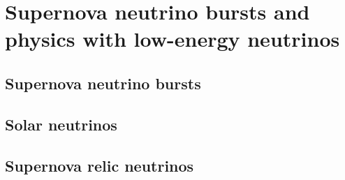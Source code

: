 \chapter{Supernova neutrino bursts and physics with low-energy neutrinos}
\label{ch:snb-lowe}


\section{Supernova neutrino bursts}
\label{sec:snb-lowe-snb}


\section{Solar neutrinos}
\label{sec:snb-lowe-solar}


\section{Supernova relic neutrinos}
\label{sec:snb-lowe-relic}



